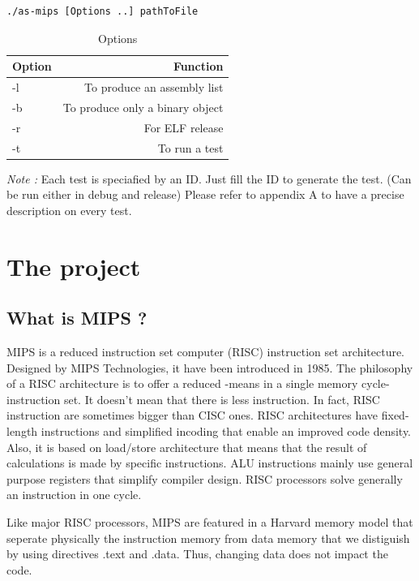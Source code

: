 \documentclass[twoside,twocolumn]{article}
\begin{document}
\begin{lstlisting}
./as-mips [Options ..] pathToFile
\end{lstlisting}


\begin{table}[h!]
\caption{Options}
\centering
\begin{tabular}{|l|r|}
\hline
Option & Function \\
\hline
-l & To produce an assembly list \\
-b & To produce only a binary object \\
-r & For ELF release \\
-t & To run a test \\
\hline
\end{tabular}
\end{table}

\textit{Note :} Each test is speciafied by an ID. Just fill the ID to generate the test. (Can be run either in debug and release) Please refer to appendix A to have a precise description on every test.



\section{The project}

\subsection{What is MIPS ?}
MIPS is a reduced instruction set computer (RISC) instruction set architecture. Designed by MIPS Technologies, it have been introduced in 1985. The philosophy of a RISC architecture is to offer a reduced -means in a single memory cycle- instruction set. It doesn't mean that there is less instruction. In fact, RISC instruction are sometimes bigger than CISC ones. RISC architectures have fixed-length instructions and simplified incoding that enable an improved code density. Also, it is based on load/store architecture that means that the result of calculations is made by specific instructions. ALU instructions mainly use general purpose registers that simplify compiler design. RISC processors solve generally an instruction in one cycle.

Like major RISC processors, MIPS are featured in a Harvard memory model that seperate physically the instruction memory from data memory that we distiguish by using directives .text and .data. Thus, changing data does not impact the code.
\end{document}
